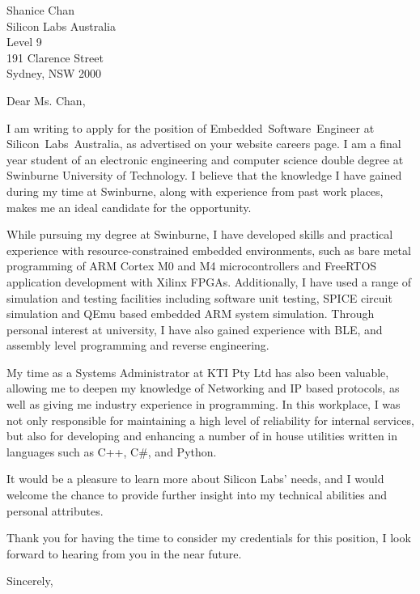 \documentclass[
    backaddress=false,
    foldmarks=false,
    fromalign=right,
    fromrule,
    fromphone,
    fromemail,
    parskip=half,
    refline=nodate
]{scrlttr2}
\begin{document}
    


    \renewcommand*\raggedsignature{\raggedright}

    \begin{letter}{%
        Shanice Chan           \\
        Silicon Labs Australia \\
        Level 9                \\
        191 Clarence Street    \\
        Sydney, NSW 2000}
        \opening{Dear Ms. Chan,}
        I am writing to apply for the position of Embedded~Software~Engineer at Silicon~Labs~Australia, as advertised on your website careers page. I am a final year student of an electronic engineering and computer science double degree at Swinburne University of Technology. I believe that the knowledge I have gained during my time at Swinburne, along with experience from past work places, makes me an ideal candidate for the opportunity.

        While pursuing my degree at Swinburne, I have developed skills and practical experience with resource-constrained embedded environments, such as bare metal programming of ARM Cortex M0 and M4 microcontrollers and FreeRTOS application development with Xilinx FPGAs. Additionally, I have used a range of simulation and testing facilities including software unit testing, SPICE circuit simulation and QEmu based embedded ARM system simulation. Through personal interest at university, I have also gained experience with BLE, and assembly level programming and reverse engineering.

        My time as a Systems Administrator at KTI Pty Ltd has also been valuable, allowing me to deepen my knowledge of Networking and IP based protocols, as well as giving me industry experience in programming. In this workplace, I was not only responsible for maintaining a high level of reliability for internal services, but also for developing and enhancing a number of in house utilities written in languages such as C++, C\#, and Python.
        
        It would be a pleasure to learn more about Silicon Labs' needs, and I would welcome the chance to provide further insight into my technical abilities and personal attributes.

        Thank you for having the time to consider my credentials for this position, I look forward to hearing from you in the near future.

        \closing{Sincerely,}
    \end{letter}
\end{document}
